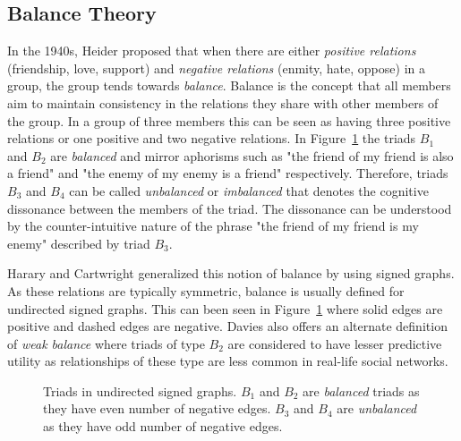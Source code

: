 \subsection{Balance Theory}
\label{sec:balance-theory}


In the 1940s, Heider \cite{heider1946attitudes} proposed  that when there are either \textit{positive relations} (friendship, love, support) and \textit{negative relations} (enmity, hate, oppose) in a group, the  group tends towards \textit{balance}.
Balance is the concept that all members aim to maintain consistency in the relations they share with other members of the group.
In a group of three members this can be seen as having three positive relations or one positive and two negative relations.
In Figure~\ref{fig:undirected-triads} the triads $B_1$ and $B_2$ are \textit{balanced} and mirror aphorisms such as "the friend of my friend is also a friend" and "the enemy of my enemy is a friend" respectively.
Therefore, triads $B_3$ and $B_4$ can be called \textit{unbalanced} or \textit{imbalanced} that denotes the cognitive dissonance between the members of the triad.
The dissonance can be understood by the counter-intuitive nature of the phrase "the friend of my friend is my enemy" described by triad $B_3$.

Harary and Cartwright \cite{cartwright1956structural} generalized this notion of balance by using signed graphs.
As these relations are typically symmetric, balance is usually defined for undirected signed graphs.
This can been seen in Figure~\ref{fig:undirected-triads} where solid edges are positive and dashed edges are negative.
Davies \cite{davis1963weakBalance} also offers an alternate definition of \textit{weak balance} where triads of type $B_2$ are considered to have lesser predictive utility as relationships of these type are less common in real-life social networks.

\begin{figure}[!ht]     
    \centering
      
    \caption{Triads in undirected signed graphs. $B_1$ and $B_2$ are \textit{balanced} triads as they have even number of negative edges. $B_3$ and $B_4$ are \textit{unbalanced} as they have odd number of negative edges.}
    \label{fig:undirected-triads}
\end{figure}

